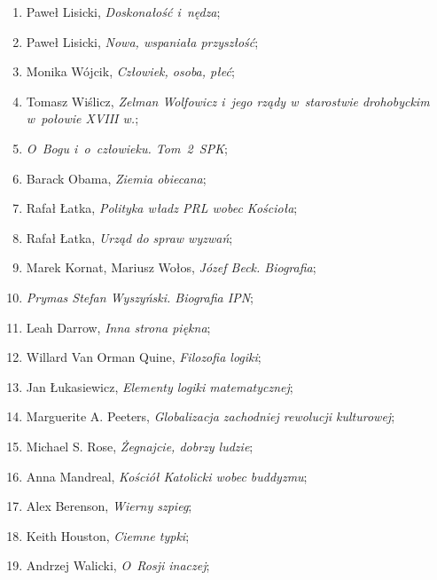 \documentclass[a4paper,11pt]{article}
\begin{document}
\begin{enumerate}
\item Paweł Lisicki, \textit{Doskonałość i~nędza};

\item Paweł Lisicki, \textit{Nowa, wspaniała przyszłość};

\item Monika Wójcik, \textit{Człowiek, osoba, płeć};

\item Tomasz Wiślicz, \textit{Zelman Wolfowicz i~jego rządy w~starostwie
  drohobyckim w~połowie XVIII w.};

\item \textit{O~Bogu i~o~człowieku. Tom~2~SPK};

\item Barack Obama, \textit{Ziemia obiecana};

\item Rafał Łatka, \textit{Polityka władz PRL wobec Kościoła};

\item Rafał Łatka, \textit{Urząd do spraw wyzwań};

\item Marek Kornat, Mariusz Wołos, \textit{Józef Beck. Biografia};

\item \textit{Prymas Stefan Wyszyński. Biografia IPN};

\item Leah Darrow, \textit{Inna strona piękna};

\item Willard Van Orman Quine, \textit{Filozofia logiki};

\item Jan Łukasiewicz, \textit{Elementy logiki matematycznej};

\item Marguerite A. Peeters, \textit{Globalizacja zachodniej rewolucji
    kulturowej};

\item Michael S. Rose, \textit{Żegnajcie, dobrzy ludzie};

\item Anna Mandreal, \textit{Kościół Katolicki wobec buddyzmu};

\item Alex Berenson, \textit{Wierny szpieg};

\item Keith Houston, \textit{Ciemne typki};

\item Andrzej Walicki, \textit{O~Rosji inaczej};


\end{enumerate}
\end{document}
